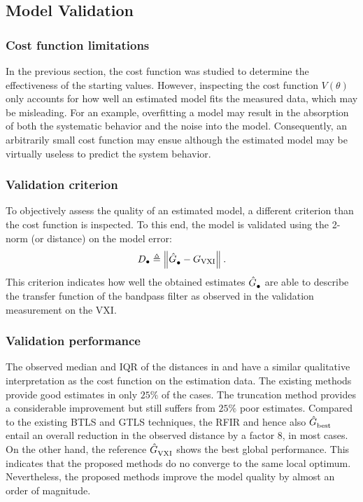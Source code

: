 \subsection{Model Validation}
\subsubsection{Cost function limitations}
In the previous section, the cost function was studied to determine the effectiveness of the starting values.
However, inspecting the cost function $V(\theta)$ only accounts for how well an estimated model fits the measured data, which may be misleading.
For an example, overfitting a model may result in the absorption of both the systematic behavior and the noise into the model. 
Consequently, an arbitrarily small cost function may ensue although the estimated model may be virtually useless to predict the system behavior.

\subsubsection{Validation criterion}
To objectively assess the quality of an estimated model, a different criterion than the cost function is inspected.
To this end, the model is validated using the 2-norm (or distance) on the model error:
\begin{equation}
  D_{\bullet} 
  \triangleq 
  \left\| \hat{G}_{\mathrm{\bullet}}^{\mathrm{}} - G_{\mathrm{VXI}} \right\|_{}
  \text{.}
  \label{eq:measurementCriterion}
\end{equation} 
This criterion indicates how well the obtained estimates $\hat{G}_{\mathrm{\bullet}}^{\mathrm{}}$ are able to describe the transfer function of the bandpass filter as observed in the validation measurement on the \gls{VXI}.

\subsubsection{Validation performance}
The observed median and \gls{IQR} of the distances in  and  have a similar qualitative interpretation as the cost function on the estimation data.
The existing methods provide good estimates in only $25\%$ of the cases.
The truncation method provides a considerable improvement but still suffers from $25\%$ poor estimates.
Compared to the existing \gls{BTLS} and \gls{GTLS} techniques, the \gls{RFIR} and hence also $\hat{G}_{\mathrm{best}}^{\mathrm{}}$ entail an overall reduction in the observed distance by a factor $8$, in most cases. 
On the other hand, the reference $\hat{G}_{\mathrm{VXI}}^{\mathrm{}}$ shows the best global performance. 
This indicates that the proposed methods do no converge to the same local optimum.
Nevertheless, the proposed methods improve the model quality by almost an order of magnitude.

